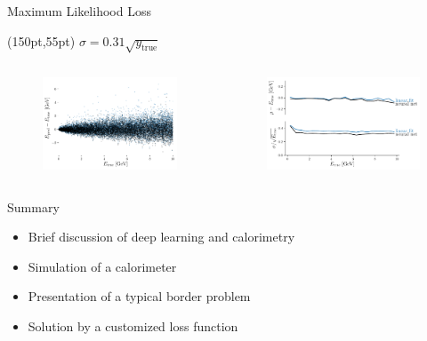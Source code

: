 \documentclass[10pt]{beamer}
\begin{document}
\begin{frame}{Maximum Likelihood Loss}
  \begin{textblock*}{150pt}(150pt,55pt)
    $\sigma = 0.31 \sqrt{y_{\text{true}}}$
  \end{textblock*}
  \begin{columns}
    \begin{figure}[htp]
      \includegraphics[width=1.1\textwidth]{../images/likelihood.pdf}
    \end{figure}
    \begin{figure}[htp]
      \includegraphics[width=1.1\textwidth]{../images/likelihood_res.pdf}
    \end{figure}
  \end{columns}
\end{frame}

\begin{frame}{Summary}
  \begin{itemize}
  \item Brief discussion of deep learning and calorimetry 
  \item Simulation of a calorimeter
  \item Presentation of a typical border problem
  \item Solution by a  customized loss function
  \end{itemize}
\end{frame}
\end{document}
